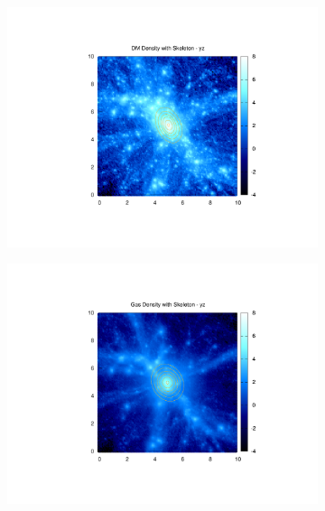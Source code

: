 \documentclass[journal]{IEEEtran}
\begin{document}
\begin{figure}[!t]
\begin{subfigure}[t]{0.3\textwidth}
		\includegraphics[width=\linewidth]{DMDenEllipyz}
	\end{subfigure}
	\quad
	\begin{subfigure}[t]{0.3\textwidth}
		\centering
		\includegraphics[width=\linewidth]{GasDenEllipyz}
	\end{subfigure}
	\quad
	\begin{subfigure}[t]{0.3\textwidth}
		\centering

\end{subfigure}
\end{figure}
\end{document}
